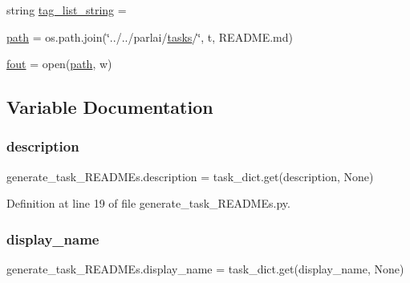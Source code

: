 \begin{DoxyCompactItemize}
\item 
string \hyperlink{namespacegenerate__task__READMEs_a7b092bf14e09c4d0daeb749f1a42eecb}{tag\+\_\+list\+\_\+string} = \textquotesingle{}\textquotesingle{}
\item 
\hyperlink{namespacegenerate__task__READMEs_ae2eccad91867a8cb484ed9d5d92187e1}{path} = os.\+path.\+join(\char`\"{}../../parlai/\hyperlink{namespacegenerate__task__READMEs_a8f4da8ba04584af52e0e9e2f209245c2}{tasks}/\char`\"{}, t, \textquotesingle{}R\+E\+A\+D\+M\+E.\+md\textquotesingle{})
\item 
\hyperlink{namespacegenerate__task__READMEs_a5ee0f93b9dd3539a16bd60d77a2a87a4}{fout} = open(\hyperlink{namespacegenerate__task__READMEs_ae2eccad91867a8cb484ed9d5d92187e1}{path}, \textquotesingle{}w\textquotesingle{})
\end{DoxyCompactItemize}


\subsection{Variable Documentation}
\mbox{\label{namespacegenerate__task__READMEs_a1fa3d286642336f46142b43041428763}} 
\subsubsection{\texorpdfstring{description}{description}}
{\footnotesize\ttfamily generate\+\_\+task\+\_\+\+R\+E\+A\+D\+M\+Es.\+description = task\+\_\+dict.\+get(\textquotesingle{}description\textquotesingle{}, None)}



Definition at line 19 of file generate\+\_\+task\+\_\+\+R\+E\+A\+D\+M\+Es.\+py.

\mbox{\label{namespacegenerate__task__READMEs_ae22075b887eb68b5bfef641a5deb2200}} 
\subsubsection{\texorpdfstring{display\+\_\+name}{display\_name}}
{\footnotesize\ttfamily generate\+\_\+task\+\_\+\+R\+E\+A\+D\+M\+Es.\+display\+\_\+name = task\+\_\+dict.\+get(\textquotesingle{}display\+\_\+name\textquotesingle{}, None)}



